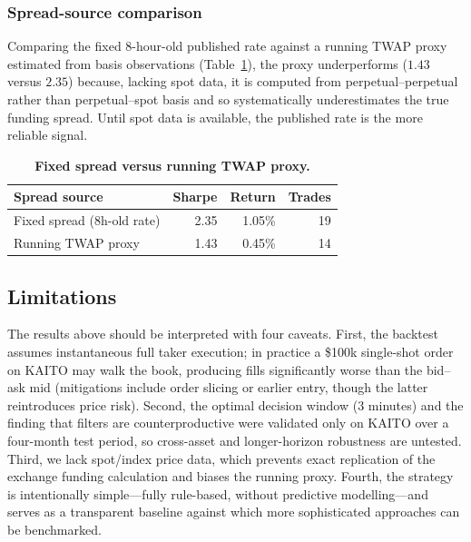 \documentclass[10pt,twocolumn,a4paper]{article}
\begin{document}
\subsubsection{Spread-source comparison}

Comparing the fixed $8$-hour-old published rate against a running TWAP
proxy estimated from basis observations (Table~\ref{tab:s1-spread}), the
proxy underperforms ($1.43$ versus $2.35$) because, lacking spot data, it
is computed from perpetual--perpetual rather than perpetual--spot basis and
so systematically underestimates the true funding spread.  Until spot data
is available, the published rate is the more reliable signal.

\begin{table}[H]
  \centering
  \caption{\textbf{Fixed spread versus running TWAP proxy.}}
  \label{tab:s1-spread}
  \begin{tabular}{lrrr}
    \toprule
    \textbf{Spread source} & \textbf{Sharpe} & \textbf{Return} & \textbf{Trades} \\
    \midrule
    Fixed spread (8h-old rate) & 2.35 & 1.05\% & 19 \\
    Running TWAP proxy         & 1.43 & 0.45\% & 14 \\
    \bottomrule
  \end{tabular}
\end{table}

\subsection{Limitations}

The results above should be interpreted with four caveats.  First, the
backtest assumes instantaneous full taker execution; in practice a \$100k
single-shot order on KAITO may walk the book, producing fills
significantly worse than the bid--ask mid (mitigations include order
slicing or earlier entry, though the latter reintroduces price risk).
Second, the optimal decision window (3 minutes) and the finding that
filters are counterproductive were validated only on KAITO over a
four-month test period, so cross-asset and longer-horizon robustness are
untested.  Third, we lack spot/index price data, which prevents exact
replication of the exchange funding calculation and biases the running
proxy.  Fourth, the strategy is intentionally simple---fully rule-based,
without predictive modelling---and serves as a transparent baseline against
which more sophisticated approaches can be benchmarked.
\end{document}
